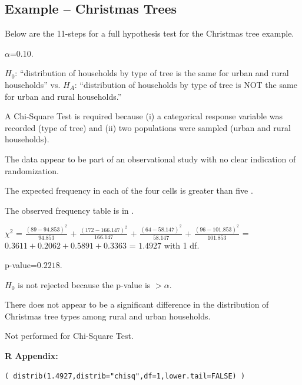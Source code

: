 \documentclass[10pt,openany]{book}\usepackage[]{graphicx}\usepackage[]{color}
\makeatletter
\newenvironment{kframe}{%
 \def\at@end@of@kframe{}%
 \ifinner\ifhmode%
  \def\at@end@of@kframe{\end{minipage}}%
  \begin{minipage}{\columnwidth}%
 \fi\fi%
 \def\FrameCommand##1{\hskip\@totalleftmargin \hskip-\fboxsep
 \colorbox{shadecolor}{##1}\hskip-\fboxsep
     \hskip-\linewidth \hskip-\@totalleftmargin \hskip\columnwidth}%
 \MakeFramed {\advance\hsize-\width
   \@totalleftmargin\z@ \linewidth\hsize
   \@setminipage}}%
 {\par\unskip\endMakeFramed%
 \at@end@of@kframe}
\newenvironment{knitrout}{}{} %
\makeatother
\begin{document}
\subsection{Example -- Christmas Trees}
\vspace{-3pt}
Below are the 11-steps  for a full hypothesis test for the Christmas tree example.
\vspace{-6pt}
\begin{Enumerate}
  \item $\alpha$=0.10.
  \item $H_{0}$: ``distribution of households by type of tree is the same for urban and rural households'' vs. $H_{A}$: ``distribution of households by type of tree is NOT the same for urban and rural households.''
  \item A Chi-Square Test is required because (i) a categorical response variable was recorded (type of tree) and (ii) two populations were sampled (urban and rural households).
  \item The data appear to be part of an observational study with no clear indication of randomization.
  \item The expected frequency in each of the four cells is greater than five .
  \item The observed frequency table is in .
  \item $\chi^{2}$ = $\frac{(89-94.853)^{2}}{94.853}$ + $\frac{(172-166.147)^{2}}{166.147}$ + $\frac{(64-58.147)^{2}}{58.147}$ + $\frac{(96-101.853)^{2}}{101.853}$ = $0.3611+0.2062+0.5891+0.3363$ = $1.4927$ with 1 df.
  \item p-value=$0.2218$.
  \item $H_{0}$ is not rejected because the p-value is $>\alpha$.
  \item There does not appear to be a significant difference in the distribution of Christmas tree types among rural and urban households.
  \item Not performed for Chi-Square Test.
\end{Enumerate}

\begin{minipage}{\textwidth}
\textbf{R Appendix:}
\vspace{-6pt}
\begin{knitrout}
\color{fgcolor}\begin{kframe}
\begin{verbatim}
( distrib(1.4927,distrib="chisq",df=1,lower.tail=FALSE) )
\end{verbatim}
\end{kframe}
\end{knitrout}
\end{minipage}
\end{document}
